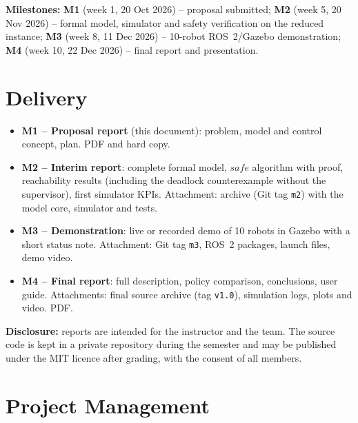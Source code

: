 \documentclass[11pt,a4paper]{article}
\begin{document}
\noindent\textbf{Milestones:}
\textbf{M1} (week 1, 20 Oct 2026) -- proposal submitted;
\textbf{M2} (week 5, 20 Nov 2026) -- formal model, simulator and safety
verification on the reduced instance;
\textbf{M3} (week 8, 11 Dec 2026) -- 10-robot ROS~2/Gazebo demonstration;
\textbf{M4} (week 10, 22 Dec 2026) -- final report and presentation.

\section{Delivery}

\begin{itemize}[leftmargin=*]
  \item \textbf{M1 -- Proposal report} (this document): problem, model and
        control concept, plan. PDF and hard copy.
  \item \textbf{M2 -- Interim report}: complete formal model, $\mathit{safe}$
        algorithm with proof, reachability results (including the deadlock
        counterexample without the supervisor), first simulator KPIs.
        Attachment: archive (Git tag \texttt{m2}) with the model core,
        simulator and tests.
  \item \textbf{M3 -- Demonstration}: live or recorded demo of 10 robots in
        Gazebo with a short status note. Attachment: Git tag \texttt{m3}, ROS~2
        packages, launch files, demo video.
  \item \textbf{M4 -- Final report}: full description, policy comparison,
        conclusions, user guide. Attachments: final source archive (tag
        \texttt{v1.0}), simulation logs, plots and video. PDF.
\end{itemize}
\textbf{Disclosure:} reports are intended for the instructor and the team.
The source code is kept in a private repository during the semester and may
be published under the MIT licence after grading, with the consent of all
members.

\section{Project Management}
\end{document}
